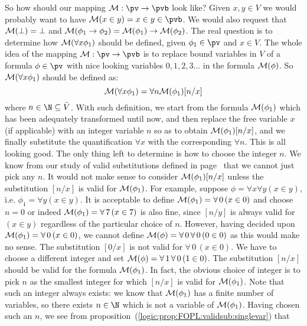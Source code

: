 So how should our mapping ${\cal M}:\pv\to\pvb$ look like? Given
$x,y\in V$ we would probably want to have ${\cal M}(x\in y)=x\in
y\in\pvb$. We would also request that ${\cal M}(\bot)=\bot$ and
${\cal M}(\phi_{1}\to\phi_{2})={\cal M}(\phi_{1})\to{\cal
M}(\phi_{2})$. The real question is to determine how ${\cal
M}(\forall x\phi_{1})$ should be defined, given $\phi_{1}\in\pv$ and
$x\in V$. The whole idea of the mapping ${\cal M}:\pv\to\pvb$ is to
replace bound variables in $V$ of a formula $\phi\in\pv$ with nice
looking variables $0,1,2,3\ldots$ in the formula ${\cal M}(\phi)$.
So ${\cal M}(\forall x\phi_{1})$ should be defined as:
    \[
    {\cal M}(\forall x\phi_{1})=\forall n{\cal M}(\phi_{1})[n/x]
    \]
where $n\in\N\subseteq\bar{V}$. With such definition, we start from
the formula ${\cal M}(\phi_{1})$ which has been adequately
transformed until now, and then replace the free variable $x$ (if
applicable) with an integer variable $n$ so as to obtain ${\cal
M}(\phi_{1})[n/x]$, and we finally substitute the quantification
$\forall x$ with the corresponding $\forall n$. This is all looking
good. The only thing left to determine is how to choose the integer
$n$. We know from our study of valid substitutions defined in
page~\pageref{logic:def:FOPL:valid:substitution} that we cannot just
pick any $n$. It would not make sense to consider ${\cal
M}(\phi_{1})[n/x]$ unless the substitution $[n/x]$ is valid for
${\cal M}(\phi_{1})$. For example, suppose $\phi=\forall x\forall
y(x\in y)$, i.e. $\phi_{1}=\forall y(x\in y)$. It is acceptable to
define ${\cal M}(\phi_{1})=\forall\,0\,(x\in 0)$ and choose $n=0$ or
indeed ${\cal M}(\phi_{1})=\forall\,7\,(x\in 7)$ is also fine, since
$[n/y]$ is always valid for $(x\in y)$ regardless of the particular
choice of $n$. However, having decided upon ${\cal
M}(\phi_{1})=\forall\,0\,(x\in 0)$, we cannot define ${\cal
M}(\phi)=\forall\,0\,\forall\,0\,(0\in 0)$ as this would make no
sense. The substitution $[0/x]$ is not valid for $\forall\,0\,(x\in
0)$. We have to choose a different integer and set ${\cal
M}(\phi)=\forall\,1\,\forall\,0\,(1\in 0)$. The substitution $[n/x]$
should be valid for the formula ${\cal M}(\phi_{1})$. In fact, the
obvious choice of integer is to pick $n$ as the smallest integer for
which $[n/x]$ is valid for ${\cal M}(\phi_{1})$. Note that such an
integer always exists: we know that ${\cal M}(\phi_{1})$ has a
finite number of variables, so there exists $n\in\N$ which is not a
variable of ${\cal M}(\phi_{1})$. Having chosen such an $n$, we see
from proposition~(\ref{logic:prop:FOPL:validsub:singlevar}) that
